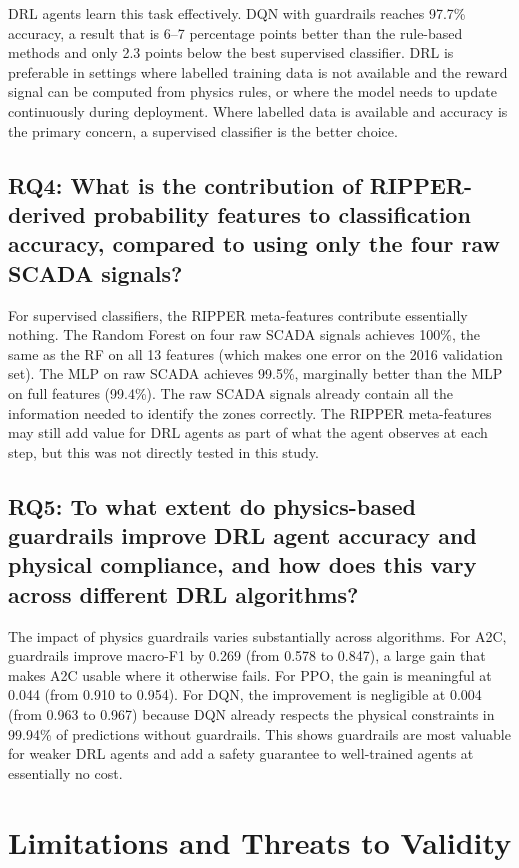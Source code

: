 DRL agents learn this task effectively. DQN with guardrails reaches 97.7\% accuracy,
a result that is 6--7 percentage points better than the rule-based methods and only
2.3 points below the best supervised classifier. DRL is preferable in settings where
labelled training data is not available and the reward signal can be computed from
physics rules, or where the model needs to update continuously during deployment.
Where labelled data is available and accuracy is the primary concern, a supervised
classifier is the better choice.

\subsection*{RQ4: What is the contribution of RIPPER-derived probability features to
classification accuracy, compared to using only the four raw SCADA signals?}

For supervised classifiers, the RIPPER meta-features contribute essentially nothing. The
Random Forest on four raw SCADA signals achieves 100\%, the same as the RF on all 13
features (which makes one error on the 2016 validation set). The MLP on raw SCADA
achieves 99.5\%, marginally better than the MLP on full features (99.4\%). The raw SCADA
signals already contain all the information needed to identify the zones correctly. The
RIPPER meta-features may still add value for DRL agents as part of what the agent observes at each step, but this was not directly tested in this study.

\subsection*{RQ5: To what extent do physics-based guardrails improve DRL agent accuracy
and physical compliance, and how does this vary across different DRL algorithms?}

The impact of physics guardrails varies substantially across algorithms. For A2C,
guardrails improve macro-F1 by 0.269 (from 0.578 to 0.847), a large gain that makes
A2C usable where it otherwise fails. For PPO, the gain is meaningful at 0.044 (from
0.910 to 0.954). For DQN, the improvement is negligible at 0.004 (from 0.963 to 0.967)
because DQN already respects the physical constraints in 99.94\% of predictions without
guardrails. This shows guardrails are most valuable for weaker DRL agents and add a
safety guarantee to well-trained agents at essentially no cost.

\section{Limitations and Threats to Validity}
\label{sec:conc:limits}

